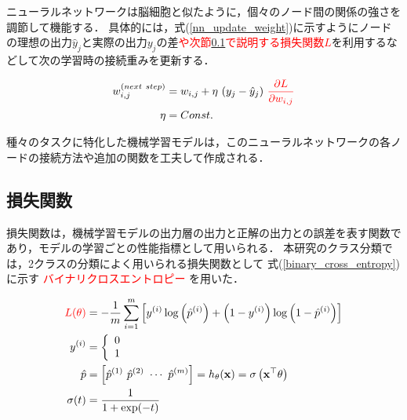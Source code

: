 \documentclass[12pt,a4j]{jreport}
\begin{document}
ニューラルネットワークは脳細胞と似たように，個々のノード間の関係の強さを調節して機能する．
具体的には，式(\ref{nn_update_weight})に示すようにノードの理想の出力$\hat{y}_j$と実際の出力$y_j$の差\textcolor{red}{や次節\ref{subsection_loss_function}で説明する損失関数$L$}を利用するなどして次の学習時の接続重みを更新する．

\begin{align}
  w_{i, j}^{(next~ step)} &= w_{i, j} + \eta~ (y_j - \hat{y}_j)~ \color{red}{\frac{\partial L}{\partial w_{i, j}}}
  \label{nn_update_weight}
  \\
  \eta &= Const.
  \label{nn_learning_rate}
\end{align}

種々のタスクに特化した機械学習モデルは，このニューラルネットワークの各ノードの接続方法や追加の関数を工夫して作成される．

\subsection{損失関数}
\label{subsection_loss_function}
損失関数は，機械学習モデルの出力層の出力と正解の出力との誤差を表す関数であり，モデルの学習ごとの性能指標として用いられる\cite{aurellen20}．
本研究のクラス分類では，2クラスの分類によく用いられる損失関数として
式(\ref{binary_cross_entropy})に示す
\textcolor{red}{バイナリクロスエントロピー}
を用いた．



\begin{align}
  \color{red}{L}(\theta)&=-\frac{1}{m} \sum_{i=1}^{m}\left[y^{(i)} \log \left(\hat{p}^{(i)}\right)+\left(1-y^{(i)}\right) \log \left(1-\hat{p}^{(i)}\right)\right]
  \label{binary_cross_entropy}
  \\
  y^{(i)}&=\left\{
    \begin{array}{l}
      0 \\
      1 
    \end{array}
  \right.
  \label{logistic_predict}
  \\
  \hat{p}
  &=\left[ \hat{p}^{(1)}~ \hat{p}^{(2)}~ \cdots~ \hat{p}^{(m)} \right]
  =h_{\theta}(\mathbf{x})
  =\sigma\left(\mathbf{x}^{\top} \theta\right)
  \label{logistic_probability}
  \\
  \sigma(t)&=\frac{1}{1+\exp (-t)}
  \label{sigmoid}
\end{align}
\end{document}
